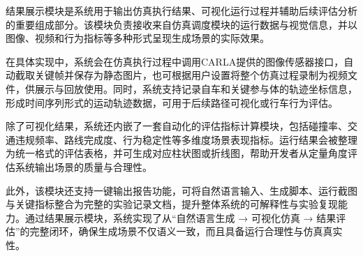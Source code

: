 结果展示模块是系统用于输出仿真执行结果、可视化运行过程并辅助后续评估分析的重要组成部分。该模块负责接收来自仿真调度模块的运行数据与视觉信息，并以图像、视频和行为指标等多种形式呈现生成场景的实际效果。

在具体实现中，系统会在仿真执行过程中调用CARLA提供的图像传感器接口，自动截取关键帧并保存为静态图片，也可根据用户设置将整个仿真过程录制为视频文件，供展示与回放使用。同时，系统支持记录自车和关键参与体的轨迹坐标信息，形成时间序列形式的运动轨迹数据，可用于后续路径可视化或行车行为评估。

除了可视化结果，系统还内嵌了一套自动化的评估指标计算模块，包括碰撞率、交通违规频率、路线完成度、行为稳定性等多维度场景表现指标。运行结果会被整理为统一格式的评估表格，并可生成对应柱状图或折线图，帮助开发者从定量角度评估系统输出场景的质量与合理性。

此外，该模块还支持一键输出报告功能，可将自然语言输入、生成脚本、运行截图与关键指标整合为完整的实验记录文档，提升整体系统的可解释性与实验复现能力。通过结果展示模块，系统实现了从“自然语言生成 → 可视化仿真 → 结果评估”的完整闭环，确保生成场景不仅语义一致，而且具备运行合理性与仿真真实性。

